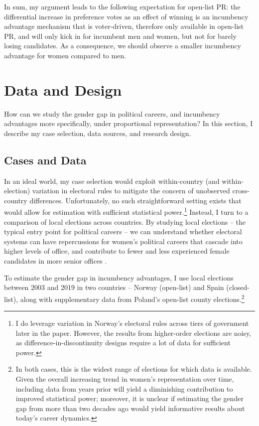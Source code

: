 \documentclass[12pt]{article}
\begin{document}
In sum, my argument leads to the following expectation for open-list PR: the differential increase in preference votes as an effect of winning is an incumbency advantage mechanism that is voter-driven, therefore only available in open-list PR, and will only kick in for incumbent men and women, but not for barely losing candidates. As a consequence, we should observe a smaller incumbency advantage for women compared to men.


\section{Data and Design}

How can we study the gender gap in political careers, and incumbency advantages more specifically, under proportional representation? In this section, I describe my case selection, data sources, and research design.

\subsection{Cases and Data}

In an ideal world, my case selection would exploit within-country (and within-election) variation in electoral rules to mitigate the concern of unobserved cross-country differences. Unfortunately, no such straightforward setting exists that would allow for estimation with sufficient statistical power.\footnote{I do leverage variation in Norway's electoral rules across tiers of government later in the paper. However, the results from higher-order elections are noisy, as difference-in-discontinuity designs require a lot of data for sufficient power.} Instead, I turn to a comparison of local elections across countries. By studying local elections -- the typical entry point for political careers -- we can understand whether electoral systems can have repercussions for women's political careers that cascade into higher levels of office, and contribute to fewer and less experienced female candidates in more senior offices \citep{cirone2020}.

To estimate the gender gap in incumbency advantages, I use local elections between 2003 and 2019 in two countries -- Norway (open-list) and Spain (closed-list), along with supplementary data from Poland's open-list county elections.\footnote{In both cases, this is the widest range of elections for which data is available. Given the overall increasing trend in women's representation over time, including data from years prior will yield a diminishing contribution to improved statistical power; moreover, it is unclear if estimating the gender gap from more than two decades ago would yield informative results about today's career dynamics.}
\end{document}
